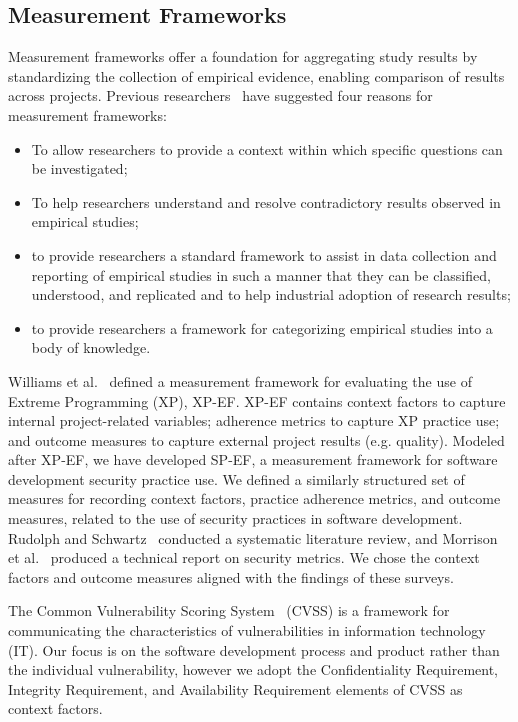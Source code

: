 \subsection{Measurement Frameworks}
Measurement frameworks offer a foundation for aggregating study results by standardizing the collection of empirical evidence, enabling comparison of results across projects. Previous researchers~\cite{kitchenham1999towards,williams2004toward} have suggested four reasons for measurement frameworks:
\begin{itemize}
	\item To allow researchers to provide a context within which specific questions can be investigated;
	\item To help researchers understand and resolve contradictory results observed in empirical studies;
	\item to provide researchers a standard framework to assist in data collection and reporting of empirical studies in such a manner that they can be classified, understood, and replicated and to help industrial adoption of research results;
	\item  to provide researchers a framework for categorizing empirical studies into a body of knowledge.
\end{itemize}

Williams et al.~\cite{williams2004toward} defined a measurement framework for evaluating the use of Extreme Programming (XP), XP-EF. XP-EF contains context factors to capture internal project-related variables; adherence metrics to capture XP practice use; and outcome measures to capture external project results (e.g. quality). Modeled after XP-EF, we have developed SP-EF, a measurement framework for software development security practice use. We defined a similarly structured set of measures for recording context factors, practice adherence metrics, and outcome measures, related to the use of security practices in software development.
Rudolph and Schwartz~\cite{rudolph2012critical} conducted a systematic literature review, and Morrison et al.~\cite{morrison2014mapping} produced a technical report on security metrics. We chose the context factors and outcome measures aligned with the findings of these surveys.

The Common Vulnerability Scoring System~\cite{mell2006common} (CVSS) is a framework for communicating the characteristics of vulnerabilities in information technology (IT). Our focus is on the software development process and product rather than the individual vulnerability, however we adopt the Confidentiality Requirement, Integrity Requirement, and Availability Requirement elements of CVSS as context factors.